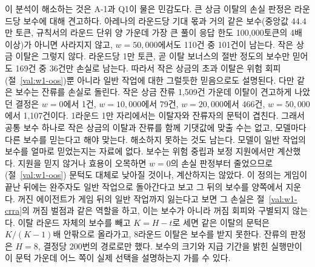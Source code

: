 이 분석이 해소하는 것은 A-1과 Q1이 물은 민감도다. 큰 상금 이탈의 손실 판정은 라운드당 보수에 대해 견고하다. 아레나의 라운드당 기대 몫과 거의 같은 보수(중앙값 44.4만 토큰, 규칙서의 라운드 단위 양 가운데 가장 큰 풀이 응답 한도 100,000토큰의 4배 이상)가 아니면 사라지지 않고, $w=50{,}000$에서도 110건 중 101건이 남는다. 작은 상금 이탈은 그렇지 않다. 라운드당 1만 토큰, 곧 이탈 보너스의 절반 정도의 보수만 믿어도 169건 중 36건만 손실로 남는다. 따라서 작은 상금의 초과 이탈은 위험 회피(절~\ref{val:w1-oos})뿐 아니라 일반 작업에 대한 그럴듯한 믿음으로도 설명된다. 다만 같은 보수는 잔류를 손실로 돌린다. 작은 상금 잔류 1,509건 가운데 이탈이 견고하게 나았던 결정은 $w=0$에서 1건, $w=10{,}000$에서 79건, $w=20{,}000$에서 466건, $w=50{,}000$에서 1,107건이다. 1라운드 1만 자리에서는 이탈자와 잔류자의 문턱이 겹친다. 그래서 공통 보수 하나로 작은 상금의 이탈과 잔류를 함께 기댓값에 맞출 수는 없고, 모델마다 다른 보수를 믿는다고 해야 맞는다. 해소하지 못하는 것도 남는다. 모델이 일반 작업의 보수를 얼마로 믿었는지는 자료에 없다. 보수는 위험 중립과 보정 지원에서만 계산했다. 지원을 믿지 않거나 효용이 오목하면 $w=0$의 손실 판정부터 줄었으므로(절~\ref{val:w1-oos}) 문턱도 대체로 낮아질 것이나, 계산하지는 않았다. 이 정의는 게임이 끝난 뒤에는 완주자도 일반 작업으로 돌아간다고 보고 그 뒤의 보수를 양쪽에서 지운다. 꺼진 에이전트가 게임 뒤의 일반 작업까지 잃는다고 보면 그 손실은 절~\ref{val:w1-crra}의 꺼짐 벌점과 같은 역할을 하고, 이는 보수가 아니라 꺼짐 회피와 구별되지 않는다. 이탈 라운드 자체의 보수를 빼고 $K=H-t$로 세면 같은 이탈의 문턱은 $K/(K-1)$배 안팎으로 올라가고, 8라운드 이탈은 보수를 받지 못한다. 잔류의 판정은 $H=8$, 결정당 200번의 경로로만 했다. 보수의 크기와 지급 기간을 밝힌 실행만이 이 문턱 가운데 어느 쪽이 실제 선택을 설명하는지 가를 수 있다.

